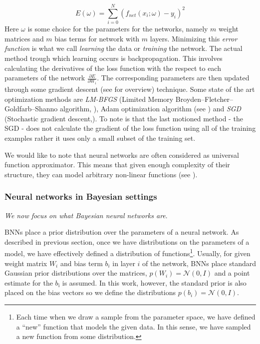 \documentclass[12pt,a4paper,twoside]{scrartcl}
\numberwithin{equation}{section}
\begin{document}
\begin{equation}
 E(\omega) =  \sum_{i=0}^N (f_{net}(x_i;\omega) - y_i)^2
\end{equation}
Here \(\omega\) is some choice for the parameters for the networks, namely \(m\) weight matrices and \(m\) bias terms for network with \(m\) layers. Minimizing this \emph{error function} is what we call \emph{learning} the data or \emph{training} the network. The actual method trough which learning occurs is backpropagation. This involves calculating the derivatives of the loss function with the respect to each parameters of the network \(\frac{\partial E}{\partial W_i }\). The corresponding parameters are then updated through some gradient descent (see \cite{ruder2016} for overview) technique. Some state of the art optimization methods are \emph{LM-BFGS} (Limited Memory Broyden–Fletcher–Goldfarb–Shanno algorithm, \cite{byrd1995}), Adam optimization algorithm (see \cite{kingma2014}) and \emph{SGD} (Stochastic gradient descent,\cite{robbins1951}). To note is that the last motioned method - the SGD - does not calculate the gradient of the loss function using all of the training examples rather it uses only a small subset of the training set.

We would like to note that neural networks are often considered as universal function approximator. This means that given enough complexity of their structure, they can model arbitrary non-linear functions (see \cite{hornik1989}).
\subsubsection{Neural networks in Bayesian settings}
\label{sec:nn-in-bayesian}
\noindent\emph{We now focus on what Bayesian neural networks are}.

BNNs place a prior distribution over the parameters of a neural network. As described in previous section, once we have distributions on the parameters of a model, we have effectively defined a distribution of functions\footnote{Each time when we draw a sample from the parameter space, we have defined a ``new'' function that models the given data. In this sense, we have sampled a new function from some distribution.}. Usually, for given weight matrix \(W_i\) and bias term \(b_i\) in layer \(i\) of the network, BNNs place standard Gaussian prior distributions over the matrices, \(p(W_i)=\mathcal{N}(0,I)\) and a point estimate for the \(b_{\text{i}}\) is assumed. In this work, however, the standard prior is also placed on the bias vectors so we define the distributions \(p(b_i)=\mathcal{N}(0,I)\).
\end{document}
